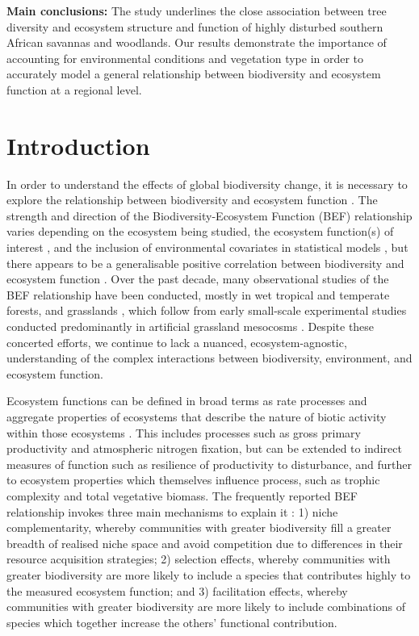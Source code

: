 \documentclass[11pt,a4paper]{article}
\begin{document}
\textbf{Main conclusions:} The study underlines the close association between tree diversity and ecosystem structure and function of highly disturbed southern African savannas and woodlands. Our results demonstrate the importance of accounting for environmental conditions and vegetation type in order to accurately model a general relationship between biodiversity and ecosystem function at a regional level. 


\section{Introduction}

In order to understand the effects of global biodiversity change, it is necessary to explore the relationship between biodiversity and ecosystem function \citep{Tilman2014}. The strength and direction of the Biodiversity-Ecosystem Function (BEF) relationship varies depending on the ecosystem being studied, the ecosystem function(s) of interest \citep{Hector2007}, and the inclusion of environmental covariates in statistical models \citep{Vila2005}, but there appears to be a generalisable positive correlation between biodiversity and ecosystem function \citep{Liang2016, Hooper2012, Cardinale2009}. Over the past decade, many observational studies of the BEF relationship have been conducted, mostly in wet tropical and temperate forests, and grasslands \citep{Chen2011}, which follow from early small-scale experimental studies conducted predominantly in artificial grassland mesocosms \citep{Tilman1994, Tilman2014}. Despite these concerted efforts, we continue to lack a nuanced, ecosystem-agnostic, understanding of the complex interactions between biodiversity, environment, and ecosystem function.

Ecosystem functions can be defined in broad terms as rate processes and aggregate properties of ecosystems that describe the nature of biotic activity within those ecosystems \citep{Jax2005}. This includes processes such as gross primary productivity and atmospheric nitrogen fixation, but can be extended to indirect measures of function such as resilience of productivity to disturbance, and further to ecosystem properties which themselves influence process, such as trophic complexity and total vegetative biomass. The frequently reported BEF relationship invokes three main mechanisms to explain it \citep{Tilman2014}: 1) niche complementarity, whereby communities with greater biodiversity fill a greater breadth of realised niche space and avoid competition due to differences in their resource acquisition strategies; 2) selection effects, whereby communities with greater biodiversity are more likely to include a species that contributes highly to the measured ecosystem function; and 3) facilitation effects, whereby communities with greater biodiversity are more likely to include combinations of species which together increase the others' functional contribution.
\end{document}
